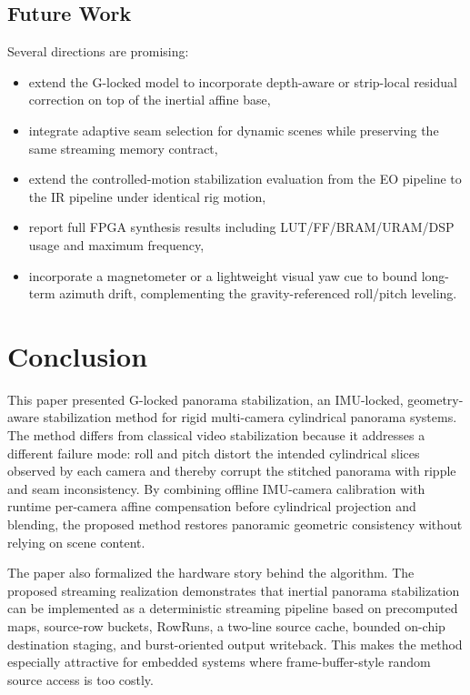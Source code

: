 \documentclass[journal]{IEEEtran}
\begin{document}
\subsection{Future Work}
Several directions are promising:
\begin{itemize}[leftmargin=*,itemsep=0pt,topsep=2pt]
  \item extend the G-locked model to incorporate depth-aware or strip-local residual correction on top of the inertial affine base,
  \item integrate adaptive seam selection for dynamic scenes while preserving the same streaming memory contract,
  \item extend the controlled-motion stabilization evaluation from the EO pipeline to the IR pipeline under identical rig motion,
  \item report full FPGA synthesis results including LUT/FF/BRAM/URAM/DSP usage and maximum frequency,
  \item incorporate a magnetometer or a lightweight visual yaw cue to bound long-term azimuth drift, complementing the gravity-referenced roll/pitch leveling.
\end{itemize}

\section{Conclusion}
\label{sec:conclusion}
This paper presented G-locked panorama stabilization, an IMU-locked, geometry-aware stabilization method for rigid multi-camera cylindrical panorama systems. The method differs from classical video stabilization because it addresses a different failure mode: roll and pitch distort the intended cylindrical slices observed by each camera and thereby corrupt the stitched panorama with ripple and seam inconsistency. By combining offline IMU-camera calibration with runtime per-camera affine compensation before cylindrical projection and blending, the proposed method restores panoramic geometric consistency without relying on scene content.

The paper also formalized the hardware story behind the algorithm. The proposed streaming realization demonstrates that inertial panorama stabilization can be implemented as a deterministic streaming pipeline based on precomputed maps, source-row buckets, RowRuns, a two-line source cache, bounded on-chip destination staging, and burst-oriented output writeback. This makes the method especially attractive for embedded systems where frame-buffer-style random source access is too costly.
\end{document}

